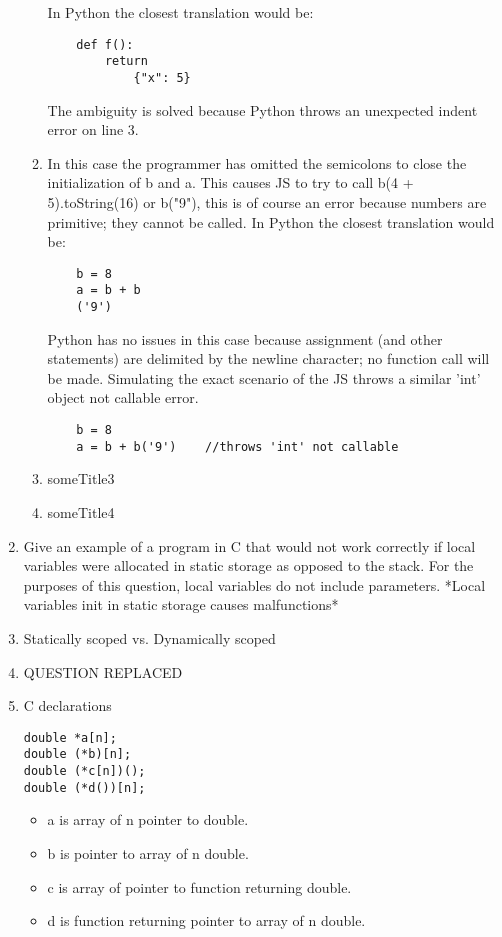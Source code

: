 \documentclass{article}
\begin{document}
\begin{enumerate}
\begin{enumerate}
    In Python the closest translation would be:
    \begin{verbatim}
    def f():
        return
            {"x": 5}    
    \end{verbatim}
    The ambiguity is solved because Python throws an unexpected indent error on line 3.
    \item In this case the programmer has omitted the semicolons to close the initialization of b and a. This causes JS to try to call b(4 + 5).toString(16) or b("9"), this is of course an error because numbers are primitive; they cannot be called.
    In Python the closest translation would be:
    \begin{verbatim}
    b = 8
    a = b + b
    ('9')
    \end{verbatim}
    Python has no issues in this case because assignment (and other statements) are delimited by the newline character; no function call will be made. Simulating the exact scenario of the JS throws a similar 'int' object not callable error.
    \begin{verbatim}
    b = 8
    a = b + b('9')    //throws 'int' not callable
    \end{verbatim}
    \item someTitle3
    \item someTitle4
\end{enumerate}
\pagebreak
\item Give an example of a program in C that would not work correctly if local variables were allocated in static storage as opposed to the stack. For the purposes of this question, local variables do not include parameters. *Local variables init in static storage causes malfunctions*
\pagebreak
\item Statically scoped vs. Dynamically scoped
\pagebreak
\item QUESTION REPLACED 
\pagebreak
\item C declarations
\begin{verbatim}
double *a[n];  
double (*b)[n];
double (*c[n])();
double (*d())[n];
\end{verbatim}
\begin{itemize}
    \item a is array of n pointer to double.
    \item b is pointer to array of n double.
    \item c is array of pointer to function returning double.
    \item d is function returning pointer to array of n double.
\end{itemize}

\end{enumerate}
\end{document}
